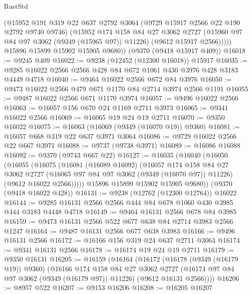 \begin{lexlean}{RustStd}
\begin{coremodule}
{\begin{coremodule}
{{{{{{{{{{{{{{{{{{{{{{{{{{{{{{{{{{{{{{{            (@15952
              @191
              @319
              @22
              @637
              @2792
              @3064
              (@9729 @15917 @2566 @22 @190 @2792 @9740 @9746)
              (@15952
                @174
                @158
                @84
                @27
                @3062
                @2727
                (@15960 @97 @84 @97 @3062 (@9349 (@15965 @97)) @11226)
                (@9612 @15917 @2566)))))
        @15896
        @15899
        @15902
        @15905
        @9680))
    (@9370 (@9418 @15917 @409))
@16018 := @9245 @409
@16022 := @9238 (@12452 (@12300 @16018)) @15917
@16035 := @9285 @16022 @2566 @2566 @428 @84 @672 @1061 @430 @3976 @428 @3183 @4449 @4718
@16040 := @9464 @16022 @2566 @672 @84 @3976
@16050 := @9473 @16022 @2566 @479 @671 @1170 @84 @2714 @3974 @2566 @1191
@16055 := @9487 @16022 @2566 @671 @1170 @3974
@16057 := @9496 @16022 @2566
@16063 := @16057 @156 @670 @24 @1169 @2711 @3973
@16065 := @9341 @16022 @2566
@16069 := @16065 @19 @24 @19 @2711
@16070 := @9350 @16022
@16075 := @16063 (@16069 (@9349 (@16070 @19)) @9360)
@16081 := @16057 @668 @319 @22 @637 @3971 @3064
@16086 := @9729 @16022 @2566 @22 @667 @3971
@16088 := @9737 (@9738 @3971)
@16089 := @16086 @16088
@16092 := @9370 (@9743 @667 @22)
@16127 := @16035
    (@16040
      (@16050
        (@16055
          (@16075
            (@16081
              (@16089 @16092)
              (@16057
                @174
                @158
                @84
                @27
                @3062
                @2727
                (@16065 @97 @84 @97 @3062 (@9349 (@16070 @97)) @11226)
                (@9612 @16022 @2566)))))
        @15896
        @15899
        @15902
        @15905
        @9680))
    (@9370 (@9418 @16022 @428))
@16131 := @9238 (@12762 (@12300 @12764)) @16022
@16144 := @9285 @16131 @2566 @2566 @444 @84 @678 @1060 @430 @3985 @444 @3183 @4448 @4718
@16149 := @9464 @16131 @2566 @678 @84 @3985
@16159 := @9473 @16131 @2566 @522 @677 @638 @84 @2714 @3983 @2566 @1247
@16164 := @9487 @16131 @2566 @677 @638 @3983
@16166 := @9496 @16131 @2566
@16172 := @16166 @156 @319 @24 @637 @2711 @3064
@16174 := @9341 @16131 @2566
@16178 := @16174 @19 @24 @19 @2711
@16179 := @9350 @16131
@16205 := @16159
    (@16164
      (@16172
        (@16178 (@9349 (@16179 @19)) @9360)
        (@16166
          @174
          @158
          @84
          @27
          @3062
          @2727
          (@16174 @97 @84 @97 @3062 (@9349 (@16179 @97)) @11226)
          (@9612 @16131 @2566))))
@16206 := @8957 @522
@16207 := @9153 @16206
@16208 := @16205 @16207
}}}}}}}}}}}}}}}}}}}}}}}}}}}}}}}}}}}}}}}
\end{coremodule}}
\end{coremodule}
\end{lexlean}
